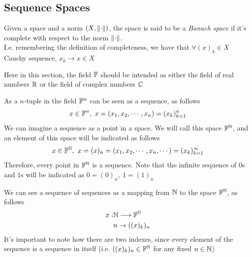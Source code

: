 \documentclass[../complete.tex]{subfiles}
\begin{document}
\subsection{Sequence Spaces}
\begin{dfn}
	Given a space and a norm $(X,\norm{\cdot})$, the space is said to be a \textit{Banach space} if it's complete with respect to the norm $\norm{\cdot}$.\\
	I.e. remembering the definition of completeness, we have that $\forall(x)_k\in X$ Cauchy sequence, $x_k\to x\in X$
\end{dfn}
\begin{ntn}
	Here in this section, the field $\mathbb{F}$ should be intended as either the field of real numbers $\mathbb{R}$ or the field of complex numbers $\mathbb{C}$
\end{ntn}
\begin{dfn}
	As a $n$-tuple in the field $\mathbb{F}^n$ can be seen as a sequence, as follows
	\begin{equation*}
		x\in\F^n,\ x=(x_1,x_2,\cdots,x_n)=(x_k)_{k=1}^n
	\end{equation*}
	We can imagine a sequence as a point in a space. We will call this space $\mathbb{F}^{\mathbb{N}}$, and an element of this space will be indicated as follows
	\begin{equation*}
		x\in\F^{\N},\ x=(x)_n=(x_1,x_2,\cdots,x_n,\cdots)=(x_k)_{k=1}^\infty
	\end{equation*}
	Therefore, every point in $\mathbb{F}^{\mathbb{N}}$ is a sequence. Note that the infinite sequence of $0$s and $1$s will be indicated as $0=(0)_n,\ 1=(1)_n$
\end{dfn}
\begin{dfn}
	We can see a sequence of sequences as a mapping from $\mathbb{N}$ to the space $\mathbb{F}^{\mathbb{N}}$, as follows
	\begin{equation*}
		\begin{aligned}
			x:&\mathbb{N}\overset{}{\longrightarrow}\mathbb{F}^{\mathbb{N}}\\
			&n\to((x)_k)_n
		\end{aligned}
	\end{equation*}
	It's important to note how there are two indexes, since every element of the sequence is a sequence in itself (i.e. $((x)_k)_n\in\mathbb{F}^{\mathbb{N}}$ for any fixed $n\in\mathbb{N}$)
\end{dfn}
\end{document}

